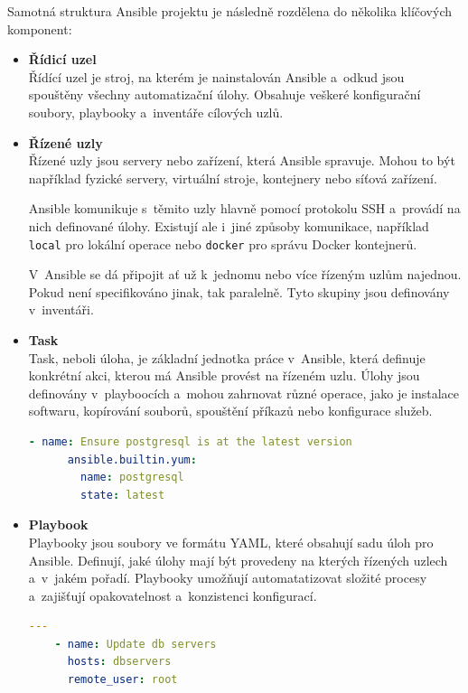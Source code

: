Samotná struktura Ansible projektu je následně rozdělena do několika klíčových komponent:
\begin{itemize}
    \item \textbf{Řídicí uzel} \\
    Řídící uzel je stroj, na kterém je nainstalován Ansible a~odkud jsou spouštěny všechny automatizační úlohy.
    Obsahuje veškeré konfigurační soubory, playbooky a~inventáře cílových uzlů. \cite{ansibledocs}

    \item \textbf{Řízené uzly} \\
    Řízené uzly jsou servery nebo zařízení, která Ansible spravuje. Mohou to být například fyzické servery, virtuální stroje, kontejnery nebo síťová zařízení.
    
    Ansible komunikuje s~těmito uzly hlavně pomocí protokolu SSH a~provádí na nich definované úlohy.
    Existují ale i~jiné způsoby komunikace, například \texttt{local} pro lokální operace nebo \texttt{docker} pro správu Docker kontejnerů. \cite{ansibledocs}
    
    V~Ansible se dá připojit ať už k~jednomu nebo více řízeným uzlům najednou. Pokud není specifikováno jinak, tak paralelně. 
    Tyto skupiny jsou definovány v~inventáři.
    \item \textbf{Task} \\
    Task, neboli úloha, je základní jednotka práce v~Ansible, která definuje konkrétní akci, kterou má Ansible provést na řízeném uzlu.
    Úlohy jsou definovány v~playboocích a~mohou zahrnovat různé operace, jako je instalace softwaru, kopírování souborů, 
    spouštění příkazů nebo konfigurace služeb. \cite{ansibledocs}
    \begin{lstlisting}[language=YAML, caption={Ansible - ukázka úlohy (Task)}, label={lst:ansibletask}, captionpos=b]
    - name: Ensure postgresql is at the latest version
      ansible.builtin.yum:
        name: postgresql
        state: latest
    \end{lstlisting}

    \item \textbf{Playbook} \\
    Playbooky jsou soubory ve formátu YAML, které obsahují sadu úloh pro Ansible.
    Definují, jaké úlohy mají být provedeny na kterých řízených uzlech a~v~jakém pořadí.
    Playbooky umožňují automatatizovat složité procesy a~zajišťují opakovatelnost a~konzistenci konfigurací. \cite{ansibledocs}
    \begin{lstlisting}[language=YAML, caption={Ansible - ukázka playbooku}, label={lst:ansibleplaybook}, captionpos=b]
    ---
    - name: Update db servers
      hosts: dbservers
      remote_user: root


\end{lstlisting}
\end{itemize}
